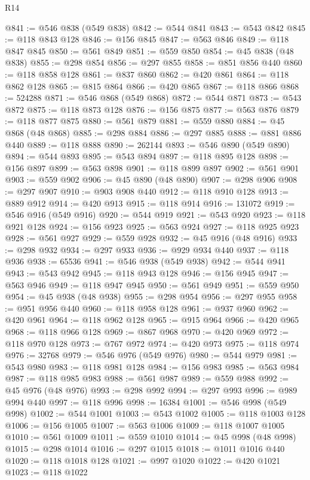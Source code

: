 \begin{lexlean}{R14}
\begin{coremodule}
{{{{{{{{{{{{{{{{{{{{{{{{{{{{{{{{{{{{{{{{{{{{{{{{{{{{{{{{{{{{{{{{{{{{{{{{{{{{{{{{{{@841 := @546 @838 (@549 @838)
@842 := @544 @841
@843 := @543 @842
@845 := @118 @843 @128
@846 := @156 @845
@847 := @563 @846
@849 := @118 @847 @845
@850 := @561 @849
@851 := @559 @850
@854 := @45 @838 (@48 @838)
@855 := @298 @854
@856 := @297 @855
@858 := @851 @856 @440
@860 := @118 @858 @128
@861 := @837 @860
@862 := @420 @861
@864 := @118 @862 @128
@865 := @815 @864
@866 := @420 @865
@867 := @118 @866
@868 := 524288
@871 := @546 @868 (@549 @868)
@872 := @544 @871
@873 := @543 @872
@875 := @118 @873 @128
@876 := @156 @875
@877 := @563 @876
@879 := @118 @877 @875
@880 := @561 @879
@881 := @559 @880
@884 := @45 @868 (@48 @868)
@885 := @298 @884
@886 := @297 @885
@888 := @881 @886 @440
@889 := @118 @888
@890 := 262144
@893 := @546 @890 (@549 @890)
@894 := @544 @893
@895 := @543 @894
@897 := @118 @895 @128
@898 := @156 @897
@899 := @563 @898
@901 := @118 @899 @897
@902 := @561 @901
@903 := @559 @902
@906 := @45 @890 (@48 @890)
@907 := @298 @906
@908 := @297 @907
@910 := @903 @908 @440
@912 := @118 @910 @128
@913 := @889 @912
@914 := @420 @913
@915 := @118 @914
@916 := 131072
@919 := @546 @916 (@549 @916)
@920 := @544 @919
@921 := @543 @920
@923 := @118 @921 @128
@924 := @156 @923
@925 := @563 @924
@927 := @118 @925 @923
@928 := @561 @927
@929 := @559 @928
@932 := @45 @916 (@48 @916)
@933 := @298 @932
@934 := @297 @933
@936 := @929 @934 @440
@937 := @118 @936
@938 := 65536
@941 := @546 @938 (@549 @938)
@942 := @544 @941
@943 := @543 @942
@945 := @118 @943 @128
@946 := @156 @945
@947 := @563 @946
@949 := @118 @947 @945
@950 := @561 @949
@951 := @559 @950
@954 := @45 @938 (@48 @938)
@955 := @298 @954
@956 := @297 @955
@958 := @951 @956 @440
@960 := @118 @958 @128
@961 := @937 @960
@962 := @420 @961
@964 := @118 @962 @128
@965 := @915 @964
@966 := @420 @965
@968 := @118 @966 @128
@969 := @867 @968
@970 := @420 @969
@972 := @118 @970 @128
@973 := @767 @972
@974 := @420 @973
@975 := @118 @974
@976 := 32768
@979 := @546 @976 (@549 @976)
@980 := @544 @979
@981 := @543 @980
@983 := @118 @981 @128
@984 := @156 @983
@985 := @563 @984
@987 := @118 @985 @983
@988 := @561 @987
@989 := @559 @988
@992 := @45 @976 (@48 @976)
@993 := @298 @992
@994 := @297 @993
@996 := @989 @994 @440
@997 := @118 @996
@998 := 16384
@1001 := @546 @998 (@549 @998)
@1002 := @544 @1001
@1003 := @543 @1002
@1005 := @118 @1003 @128
@1006 := @156 @1005
@1007 := @563 @1006
@1009 := @118 @1007 @1005
@1010 := @561 @1009
@1011 := @559 @1010
@1014 := @45 @998 (@48 @998)
@1015 := @298 @1014
@1016 := @297 @1015
@1018 := @1011 @1016 @440
@1020 := @118 @1018 @128
@1021 := @997 @1020
@1022 := @420 @1021
@1023 := @118 @1022
}}}}}}}}}}}}}}}}}}}}}}}}}}}}}}}}}}}}}}}}}}}}}}}}}}}}}}}}}}}}}}}}}}}}}}}}}}}}}}}}}}
\end{coremodule}
\end{lexlean}
